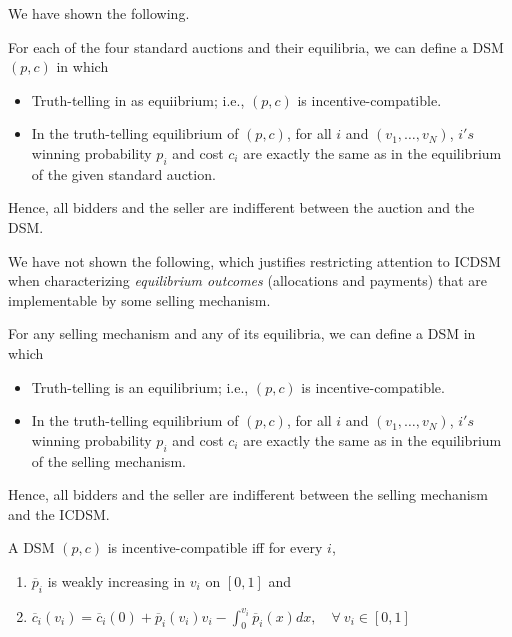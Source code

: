 We have shown the following.

\begin{theorem}
	For each of the four standard auctions and their equilibria, we can define a DSM $(p,c)$ in which 
	\begin{itemize}
		\item Truth-telling in as equiibrium; i.e., $(p,c)$ is incentive-compatible.
		\item In the truth-telling equilibrium of $(p,c)$, for all $i$ and $(v_1,\ldots,v_N)$, $i's$ winning probability $p_i$ and cost $c_i$ are exactly the same as in the equilibrium of the given standard auction.
	\end{itemize}
	Hence, all bidders and the seller are indifferent between the auction and the DSM.
\end{theorem}

We have not shown the following, which justifies restricting attention to ICDSM when characterizing \emph{equilibrium outcomes} (allocations and payments)
that are implementable by some selling mechanism.

\begin{theorem}
	For any selling mechanism and any of its equilibria, we can define a DSM in which
	\begin{itemize}
		\item Truth-telling is an equilibrium; i.e., $(p,c)$ is incentive-compatible.
		\item In the truth-telling equilibrium of $(p,c)$, for all $i$ and $(v_1,\ldots,v_N)$, $i's$ winning probability $p_i$ and cost $c_i$ are exactly the same as in the equilibrium of the selling mechanism.
	\end{itemize}
	Hence, all bidders and the seller are indifferent between the selling mechanism and the ICDSM.
\end{theorem}

\begin{theorem} \label{1-20-1}
	A DSM $(p,c)$ is incentive-compatible iff for every $i$,
	\begin{enumerate}[label=(\roman*)]
		\item $\overline{p}_i$ is weakly increasing in $v_i$ on $[0,1]$ and
		\item $\overline{c}_i(v_i) = \overline{c}_i (0) + \overline{p}_i (v_i)v_i - \int_{0}^{v_i} \overline{p}_i(x)dx, \quad \forall\ v_i \in [0,1] $
	\end{enumerate}
\end{theorem}

